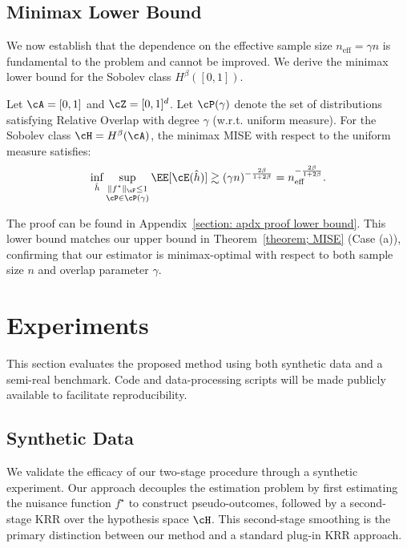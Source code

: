 \documentclass[english,11pt]{article}
\begin{document}
\subsection{Minimax Lower Bound}\label{section: lower bound}

We now establish that the dependence on the effective sample size $n_{\operatorname{eff}} = \gamma n$ is fundamental to the problem and cannot be improved.
We derive the minimax lower bound for the Sobolev class $H^\beta([0,1])$.

\begin{theorem}\label{theorem; lower bound}
    Let $\cA = [0,1]$ and $\cZ = [0,1]^d$. Let $\cP(\gamma)$ denote the set of distributions satisfying Relative Overlap with degree $\gamma$ (w.r.t. uniform measure). For the Sobolev class $\cH = H^\beta(\cA)$, the minimax MISE with respect to the uniform measure satisfies:
    \begin{align}
        \inf_{\hat{h}} \sup_{\substack{\|f^\star\|_{\cF} \le 1 \\ \cP \in \cP(\gamma)}} \EE[\cE(\hat{h})] \gtrsim (\gamma n)^{-\frac{2\beta}{1+2\beta}} = n_{\operatorname{eff}}^{-\frac{2\beta}{1+2\beta}}.
    \end{align}
\end{theorem}
The proof can be found in Appendix~\ref{section: apdx proof lower bound}. This lower bound matches our upper bound in Theorem~\ref{theorem; MISE} (Case (a)), confirming that our estimator is minimax-optimal with respect to both sample size $n$ and overlap parameter $\gamma$.

\section{Experiments}\label{section:experiments}
This section evaluates the proposed method using both synthetic data and a semi-real benchmark.
Code and data-processing scripts will be made publicly available to facilitate reproducibility.

\subsection{Synthetic Data}
We validate the efficacy of our two-stage procedure through a synthetic experiment.
Our approach decouples the estimation problem by first estimating the nuisance function $f^\star$ to construct pseudo-outcomes, followed by a second-stage KRR over the hypothesis space $\cH$.
This second-stage smoothing is the primary distinction between our method and a standard plug-in KRR approach.
\end{document}
